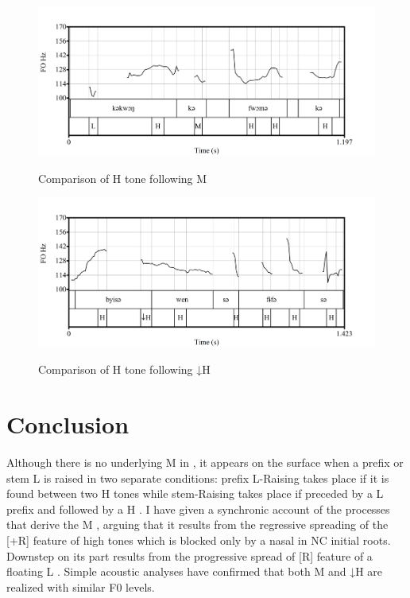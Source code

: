 \documentclass[output=paper,modfonts,nonflat,
colorlinks, citecolor=brown,
draftmode,
draft
]{langsci/langscibook}
\begin{document}
\begin{figure}[htbp]
	{\includegraphics[width=\textwidth]{figures/fig-akumbu-3a}}\\
    \caption{Comparison of H tone following M} \label{fig:akumbu:3}
\end{figure}
\begin{figure}[htbp]
	{\includegraphics[width=\textwidth]{figures/fig-akumbu-3b}}
    \caption{Comparison of H tone following ↓H} \label{fig:akumbu:4}
\end{figure}


\section{Conclusion}\label{sec:akumbu:6}

Although there is no underlying M  in , it appears on the surface when a prefix or stem L  is raised in two separate conditions: prefix L-Raising takes place if it is found between two H tones while stem-Raising takes place if preceded by a L prefix and followed by a H . I have given a synchronic account of the processes that derive the M , arguing that it results from the regressive spreading of the [+R] feature of high tones which is blocked only by a nasal in NC initial roots. Downstep on its part results from the progressive spread of [\textminus R] feature of a floating L . Simple acoustic analyses have confirmed that both M and ↓H are realized with similar F0 levels.
	
\end{document}
